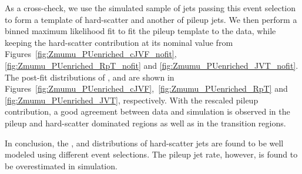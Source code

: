 \documentclass{atlasnote}
\begin{document}
As a cross-check, we use the simulated sample of jets passing this event selection to form a template of hard-scatter and another of pileup jets. 
We then perform a binned maximum likelihood fit to fit the pileup template to the data, while keeping the hard-scatter contribution at its
nominal value from Figures~\ref{fig:Zmumu_PUenriched_cJVF_nofit}, \ref{fig:Zmumu_PUenriched_RpT_nofit} and \ref{fig:Zmumu_PUenriched_JVT_nofit}. 
The post-fit distributions of \cJVF, \RpT and \JVT are shown in Figures~\ref{fig:Zmumu_PUenriched_cJVF},~\ref{fig:Zmumu_PUenriched_RpT} and \ref{fig:Zmumu_PUenriched_JVT}, 
respectively. With the rescaled pileup contribution, a good agreement between data and simulation is observed in the pileup and hard-scatter dominated 
regions as well as in the transition regions.  


In conclusion, the \cJVF, \RpT and \JVT distributions of hard-scatter jets are found to be well modeled using different event selections. 
The pileup jet rate, however, 
is found to be overestimated in simulation. 
\end{document}
